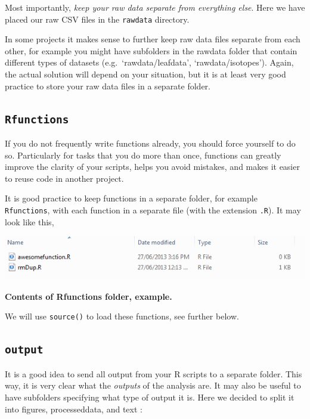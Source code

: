 \documentclass[]{book}
\begin{document}
Most importantly, \emph{keep your raw data separate from everything else}. Here we have placed our raw CSV files in the \texttt{rawdata} directory.

In some projects it makes sense to further keep raw data files separate from each other, for example you might have subfolders in the rawdata folder that contain different types of datasets (e.g.~`rawdata/leafdata', `rawdata/isotopes'). Again, the actual solution will depend on your situation, but it is at least very good practice to store your raw data files in a separate folder.

\hypertarget{rfunctions}{%
\subsection{\texorpdfstring{\texttt{Rfunctions}}{Rfunctions}}\label{rfunctions}}

If you do not frequently write functions already, you should force yourself to do so. Particularly for tasks that you do more than once, functions can greatly improve the clarity of your scripts, helps you avoid mistakes, and makes it easier to reuse code in another project.

It is good practice to keep functions in a separate folder, for example \texttt{Rfunctions}, with each function in a separate file (with the extension \texttt{.R}). It may look like this,

\includegraphics[width=0.7\linewidth]{screenshots/rfunctions}

\textbf{Contents of Rfunctions folder, example.}

We will use \texttt{source()} to load these functions, see further below.

\hypertarget{output}{%
\subsection{\texorpdfstring{\texttt{output}}{output}}\label{output}}

It is a good idea to send all output from your R scripts to a separate folder. This way, it is very clear what the \emph{outputs} of the analysis are. It may also be useful to have subfolders specifying what type of output it is. Here we decided to split it into figures, processeddata, and text :
\end{document}
